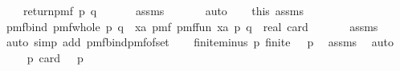 \begin{isabellebody}
\ \ \ \ return{\isacharunderscore}{\kern0pt}pmf\ {\isacharparenleft}{\kern0pt}p{\isacharcomma}{\kern0pt}\ q{\isacharparenright}{\kern0pt}{\isacharbraceright}{\kern0pt}{\isacharparenright}{\kern0pt}{\isachardoublequoteclose}\isanewline
\ \ \isanewline
\ \ \isamarkupfalse%
\ assms{\isacharparenleft}{\kern0pt}{}{\isacharparenright}{\kern0pt}\ \isamarkupfalse%
\ {\isachardoublequoteopen}{\isasymK}\ {\isasymnoteq}\ {\isacharbraceleft}{\kern0pt}{\isacharbraceright}{\kern0pt}{\isachardoublequoteclose}\ \isamarkupfalse%
\ auto\isanewline
\ \ \isamarkupfalse%
\ this\ assms{\isacharparenleft}{\kern0pt}{}{\isacharparenright}{\kern0pt}\isanewline
\ \ \isamarkupfalse%
\ pmf{\isacharunderscore}{\kern0pt}bind{\isacharunderscore}{\kern0pt}{}{\isacharcolon}{\kern0pt}\ {\isachardoublequoteopen}{\isacharquery}{\kern0pt}pmf{\isacharunderscore}{\kern0pt}whole\ {\isacharparenleft}{\kern0pt}p{\isacharcomma}{\kern0pt}\ q{\isacharparenright}{\kern0pt}\ {\isacharequal}{\kern0pt}\ {\isacharparenleft}{\kern0pt}{\isasymSum}xa{\isasymin}{\isasymK}{\isachardot}{\kern0pt}\ pmf\ {\isacharparenleft}{\kern0pt}{\isacharquery}{\kern0pt}pmf{\isacharunderscore}{\kern0pt}fun\ xa{\isacharparenright}{\kern0pt}\ {\isacharparenleft}{\kern0pt}p{\isacharcomma}{\kern0pt}\ q{\isacharparenright}{\kern0pt}{\isacharparenright}{\kern0pt}\ {\isacharslash}{\kern0pt}\ real\ {\isacharparenleft}{\kern0pt}card\ {\isasymK}{\isacharparenright}{\kern0pt}{\isachardoublequoteclose}\isanewline
\ \ \ \ \isamarkupfalse%
\ assms\isanewline
\ \ \ \ \isamarkupfalse%
\ {\isacharparenleft}{\kern0pt}auto\ simp\ add{\isacharcolon}{\kern0pt}\ pmf{\isacharunderscore}{\kern0pt}bind{\isacharunderscore}{\kern0pt}pmf{\isacharunderscore}{\kern0pt}of{\isacharunderscore}{\kern0pt}set{\isacharparenright}{\kern0pt}\isanewline
\isanewline
\ \ \isamarkupfalse%
\ finite{\isacharunderscore}{\kern0pt}minus{\isacharcolon}{\kern0pt}\ {\isachardoublequoteopen}{\isasymAnd}p{\isachardot}{\kern0pt}\ finite\ {\isacharparenleft}{\kern0pt}{\isasymK}\ {\isacharminus}{\kern0pt}\ {\isacharbraceleft}{\kern0pt}p{\isacharbraceright}{\kern0pt}{\isacharparenright}{\kern0pt}{\isachardoublequoteclose}\ \isamarkupfalse%
\ assms{\isacharparenleft}{\kern0pt}{}{\isacharparenright}{\kern0pt}\ \isamarkupfalse%
\ auto\isanewline
\ \ \isamarkupfalse%
\ \ {\isachardoublequoteopen}{\isasymAnd}p{\isachardot}{\kern0pt}\ card\ {\isacharparenleft}{\kern0pt}{\isasymK}\ {\isacharminus}{\kern0pt}\ {\isacharbraceleft}{\kern0pt}p{\isacharbraceright}{\kern0pt}{\isacharparenright}{\kern0pt}\ {\isachargreater}{\kern0pt}\ {}{\isachardoublequoteclose}\ \isamarkupfalse%

\end{isabellebody}
